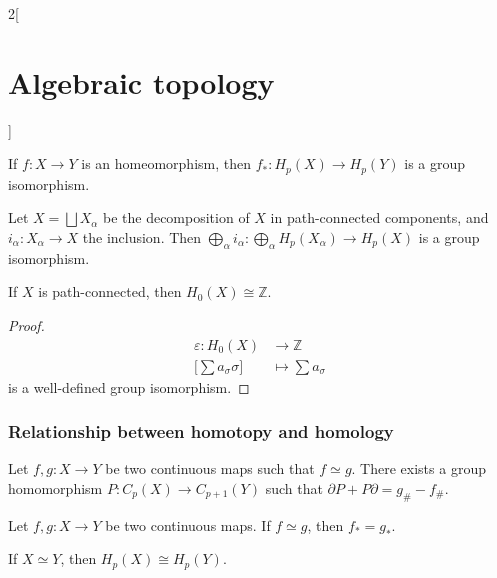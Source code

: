 \documentclass[../../../main_math.tex]{subfiles}
\begin{document}
\begin{multicols}{2}[\section{Algebraic topology}]
  \begin{corollary}
    If $f:X\to Y$ is an homeomorphism, then $f_*: H_p(X) \to H_p(Y)$ is a group isomorphism.
  \end{corollary}

  \begin{proposition}
    Let $X=\bigsqcup X_{\alpha}$ be the decomposition of $X$ in path-connected components, and $i_{\alpha}:X_{\alpha} \to X$ the inclusion. Then $\bigoplus_{\alpha} i_{\alpha}: \bigoplus_{\alpha} H_p(X_{\alpha}) \to H_p(X)$ is a group isomorphism.
  \end{proposition}

  \begin{proposition}
    If $X$ is path-connected, then $H_0(X)\cong \mathbb{Z}$.
  \end{proposition}

  \begin{proof}
    \begin{align*}
      \varepsilon: H_0(X)                 & \longrightarrow \mathbb{Z}  \\
      \bigg[ \sum a_{\sigma}\sigma \bigg] & \longmapsto \sum a_{\sigma}
    \end{align*}
    is a well-defined group isomorphism.
  \end{proof}

  \subsubsection{Relationship between homotopy and homology}
  \begin{lemma}
    Let $f,g:X\to Y$ be two continuous maps such that $f\simeq g$. There exists a group homomorphism $P: C_p(X)\to C_{p+1}(Y)$ such that $\partial P + P\partial =g_{\#}-f_{\#}$.
  \end{lemma}

  \begin{theorem}
    Let $f,g:X\to Y$ be two continuous maps. If $f\simeq g$, then $f_*=g_*$.
  \end{theorem}

  \begin{corollary}
    If $X\simeq Y$, then $H_p(X)\cong H_p(Y)$.
  \end{corollary}

\end{multicols}
\end{document}
